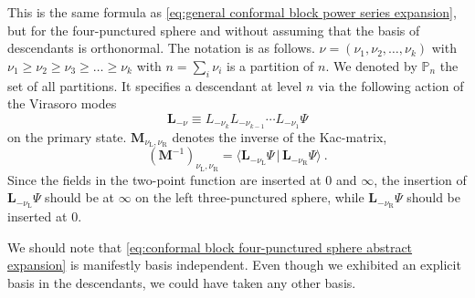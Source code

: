 \documentclass[12pt,a4paper]{article}
\newcommand{\be}{\begin{equation}}
\newcommand{\ee}{\end{equation}}
\begin{document}
This is the same formula as \eqref{eq:general conformal block power series expansion}, but for the four-punctured sphere and without assuming that the basis of descendants is orthonormal. The notation is as follows.
$\nu=(\nu_1,\nu_2,\dots,\nu_k)$ with $\nu_1 \ge \nu_2 \ge \nu_3 \ge \dots \ge \nu_k$ with $n=\sum_i \nu_i$ is a partition of $n$. We denoted by $\mathbb{P}_n$ the set of all partitions. It specifies a descendant at level $n$ via the following action of the Virasoro modes
\be 
    \mathbf{L}_{-\nu} \equiv L_{-\nu_k} L_{-\nu_{k-1}} \cdots L_{-\nu_1} \Psi
\ee
on the primary state. $\mathbf{M}_{\nu_\text{L},\nu_\text{R}}$ denotes the inverse of the Kac-matrix,
\be 
(\mathbf{M}^{-1})_{\nu_\text{L},\nu_\text{R}}=\langle \mathbf{L}_{-\nu_\text{L}} \Psi\, |\, \mathbf{L}_{-\nu_\text{R}} \Psi \rangle\ . \label{eq:Kac matrix definition}
\ee
Since the fields in the two-point function are inserted at $0$ and $\infty$, the insertion of $\mathbf{L}_{-\nu_\text{L}}\Psi$ should be at $\infty$ on the left three-punctured sphere, while  $\mathbf{L}_{-\nu_\text{R}}\Psi$ should be inserted at $0$.

We should note that \eqref{eq:conformal block four-punctured sphere abstract expansion} is manifestly basis independent. Even though we exhibited an explicit basis in the descendants, we could have taken any other basis.
\end{document}
